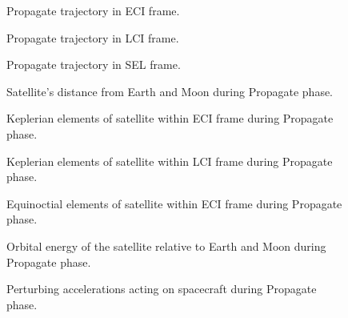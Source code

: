 \begin{figure}
\centering
%
\caption{Propagate trajectory in ECI frame.}
\label{fig:Propagate-3D}
\end{figure}

\begin{figure}
\centering
%
\caption{Propagate trajectory in LCI frame.}
\label{fig:Propagate-3D-lci}
\end{figure}

\begin{figure}
\centering
%
\caption{Propagate trajectory in SEL frame.}
\label{fig:Propagate-3D-sel}
\end{figure}

\begin{figure}
\centering
%
\caption{Satellite's distance from Earth and Moon during Propagate phase.}
\label{fig:Propagate-dist}
\end{figure}

\begin{figure}
\centering
%
\caption{Keplerian elements of satellite within ECI frame during Propagate phase.}
\label{fig:Propagate-kep}
\end{figure}

\begin{figure}
\centering
%
\caption{Keplerian elements of satellite within LCI frame during Propagate phase.}
\label{fig:Propagate-kep-lci}
\end{figure}

\begin{figure}
\centering
%
\caption{Equinoctial elements of satellite within ECI frame during Propagate phase.}
\label{fig:Propagate-mee}
\end{figure}

\begin{figure}
\centering
%
\caption{Orbital energy of the satellite relative to Earth and Moon during Propagate phase.}
\label{fig:Propagate-orbeng}
\end{figure}

\begin{figure}
\centering
%
\caption{Perturbing accelerations acting on spacecraft during Propagate phase.}
\label{fig:Propagate-pert}
\end{figure}

